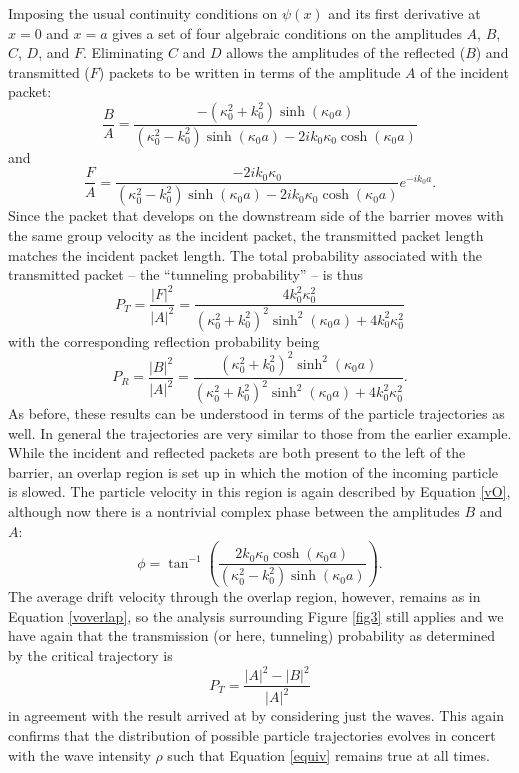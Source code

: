 \documentclass[aps,prc,twocolumn,letterpaper,floatfix]{revtex4}
\begin{document}
Imposing the usual continuity conditions on $\psi(x)$ and its first
derivative at $x=0$ and $x=a$ gives a set of four algebraic conditions
on the amplitudes $A$, $B$, $C$, $D$, and $F$.  Eliminating $C$ and
$D$ allows the amplitudes of the reflected ($B$) and transmitted ($F$)
packets to be written in terms of the amplitude $A$ of the incident
packet:
\begin{equation}
\frac{B}{A} = \frac{ - (\kappa_0^2 + k_0^2) \sinh(\kappa_0 a)
}{(\kappa_0^2 - k_0^2) \sinh(\kappa_0 a) - 2 i k_0 \kappa_0
  \cosh(\kappa_0 a)}
\label{tunnelBA}
\end{equation}
and
\begin{equation}
\frac{F}{A} = \frac{-2i k_0 \kappa_0}{(\kappa_0^2 - k_0^2)
  \sinh(\kappa_0 a) - 2 i k_0 \kappa_0 \cosh(\kappa_0 a)} e^{-i k_0 a}.
\end{equation}
Since the packet that develops on the downstream side of the barrier
moves with the same group velocity as the incident packet, the
transmitted packet length matches the incident packet length.  The
total probability associated with the transmitted packet -- the
``tunneling probability'' -- is thus
\begin{equation}
P_T = \frac{|F|^2}{|A|^2} = \frac{4 k_0^2
  \kappa_0^2}{(\kappa_0^2+k_0^2)^2 \sinh^2(\kappa_0 a) + 4 k_0^2 \kappa_0^2}
\end{equation}
with the corresponding reflection probability being
\begin{equation}
P_R = \frac{|B|^2}{|A|^2} = \frac{ (\kappa_0^2 + k_0^2)^2
  \sinh^2(\kappa_0 a) }{(\kappa_0^2 + k_0^2)^2
  \sinh^2(\kappa_0 a)+ 4 k_0^2 \kappa_0^2}.
\end{equation}
As before, these results can be understood in terms of the particle
trajectories as well.  In general the trajectories are very similar to
those from the earlier example.  While the incident and reflected
packets are both present to the left of the barrier, an overlap region 
is set up in which the motion of the incoming particle is slowed.
The particle velocity in this region is again described by Equation
\eqref{vO}, although now there is a nontrivial complex phase between
the amplitudes $B$ and $A$:
\begin{equation}
\phi = \tan^{-1}\left( \frac{ 2 k_0 \kappa_0 \cosh(\kappa_0 a)
  }{(\kappa_0^2-k_0^2) \sinh(\kappa_0 a) } \right).
\end{equation}
The average drift velocity through the overlap region, however,
remains as in Equation \eqref{voverlap}, so the analysis surrounding
Figure \ref{fig3} still applies and we have again that the
transmission (or here, tunneling) probability as determined by the
critical trajectory is
\begin{equation}
P_T = \frac{|A|^2 - |B|^2}{|A|^2}
\end{equation}
in agreement with the result arrived at by considering just the
waves.  This again confirms that the distribution of possible particle
trajectories evolves in concert with the wave intensity $\rho$ such
that Equation \eqref{equiv} remains true at all times.  
\end{document}
